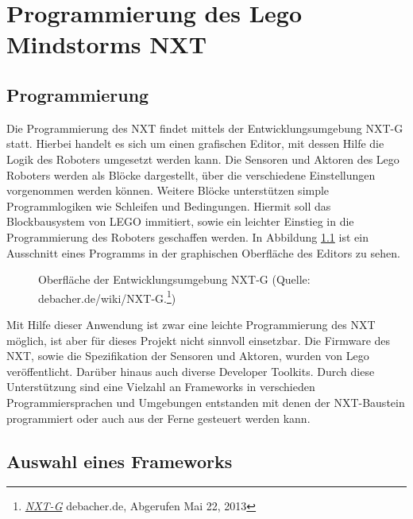\chapter{Programmierung des Lego Mindstorms NXT}
\label{chap:Lego-Framework}


\section{Programmierung}

Die Programmierung des NXT findet mittels der Entwicklungsumgebung NXT-G statt. Hierbei handelt es sich um einen grafischen Editor, mit dessen Hilfe die Logik des Roboters umgesetzt werden kann. Die Sensoren und Aktoren des Lego Roboters werden als Bl\"ocke dargestellt, \"uber die verschiedene Einstellungen vorgenommen werden k\"onnen. Weitere Bl\"ocke unterst\"utzen simple Programmlogiken wie Schleifen und Bedingungen. Hiermit soll das Blockbausystem von LEGO immitiert, sowie ein leichter Einstieg in die Programmierung des Roboters geschaffen werden. In Abbildung \ref{fig:nxtg} ist ein Ausschnitt eines Programms in der graphischen Oberfl\"ache des Editors zu sehen.

\begin{figure}[htb]
\centering
\caption[Skeleton]{Oberfl\"ache der Entwicklungsumgebung NXT-G (Quelle: debacher.de/wiki/NXT-G.\footnote{\href{http://www.debacher.de/wiki/NXT-G}{\textit{NXT-G}} debacher.de, Abgerufen Mai 22, 2013})}
\label{fig:nxtg}
\end{figure}


\par\smallskip 
Mit Hilfe dieser Anwendung ist zwar eine leichte Programmierung des NXT m\"oglich, ist aber f\"ur dieses Projekt nicht sinnvoll einsetzbar. Die Firmware des NXT, sowie die Spezifikation der Sensoren und Aktoren, wurden von Lego ver\"offentlicht. Dar\"uber hinaus auch diverse Developer Toolkits. Durch diese Unterst\"utzung sind eine Vielzahl an Frameworks in verschieden Programmiersprachen und Umgebungen entstanden mit denen der NXT-Baustein programmiert oder auch aus der Ferne gesteuert werden kann.

\section{Auswahl eines Frameworks}


